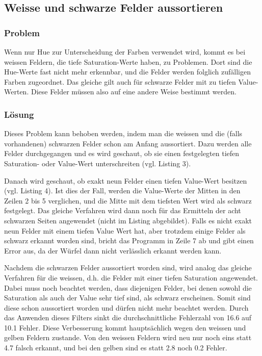 \documentclass[a4paper, 12pt]{article}
\begin{document}
\subsection{Weisse und schwarze Felder aussortieren}
\subsubsection{Problem}
Wenn nur Hue zur Unterscheidung der Farben verwendet wird, kommt es bei weissen Feldern, die tiefe Saturation-Werte haben, zu Problemen. Dort sind die Hue-Werte fast nicht mehr erkennbar, und die Felder werden folglich zufälligen Farben zugeordnet. Das gleiche gilt auch für schwarze Felder mit zu tiefen Value-Werten. Diese Felder müssen also auf eine andere Weise bestimmt werden. 
\subsubsection{Lösung}
Dieses Problem kann behoben werden, indem man die weissen und die (falls vorhandenen) schwarzen Felder schon am Anfang aussortiert. Dazu werden alle Felder durchgegangen und es wird geschaut, ob sie einen festgelegten tiefen Saturation- oder Value-Wert unterschreiten (vgl. Listing 3).

Danach wird geschaut, ob exakt neun Felder einen tiefen Value-Wert besitzen (vgl. Listing 4). Ist dies der Fall, werden die Value-Werte der Mitten in den Zeilen 2 bis 5 verglichen, und die Mitte mit dem tiefsten Wert wird als schwarz festgelegt. Das gleiche Verfahren wird dann noch für das Ermitteln der acht schwarzen Seiten angewendet (nicht im Listing abgebildet). Falls es nicht exakt neun Felder mit einem tiefen Value Wert hat, aber trotzdem einige Felder als schwarz erkannt worden sind, bricht das Programm in Zeile 7 ab und gibt einen Error aus, da der Würfel dann nicht verlässlich erkannt werden kann.
\newpage 

 Nachdem die schwarzen Felder aussortiert worden sind, wird analog das gleiche Verfahren für die weissen, d.h. die Felder mit einer tiefen Saturation angewendet. Dabei muss noch beachtet werden, dass diejenigen Felder, bei denen sowohl die Saturation als auch der Value sehr tief sind, als schwarz erscheinen. Somit sind diese schon aussortiert worden und dürfen nicht mehr beachtet werden. 
\noindent
Durch das Anwenden dieses Filters sinkt die durchschnittliche Fehlerzahl von 16.6 auf 10.1 Fehler. Diese Verbesserung kommt hauptsächlich wegen den weissen und gelben Feldern zustande. Von den weissen Feldern wird neu nur noch eins statt 4.7 falsch erkannt, und bei den gelben sind es statt 2.8 noch 0.2 Fehler.
\end{document}

